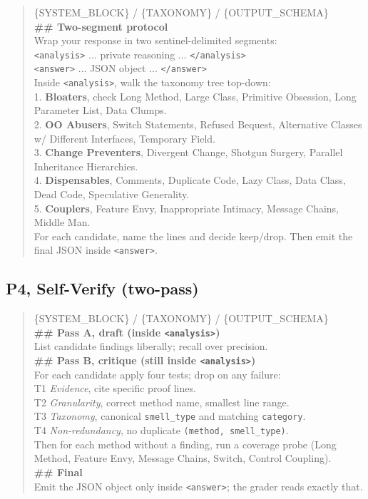 \documentclass[conference]{IEEEtran}
\begin{document}
\begin{quote}\small\ttfamily
\{SYSTEM\_BLOCK\} / \{TAXONOMY\} / \{OUTPUT\_SCHEMA\}\\[0.3em]
\textbf{\#\# Two-segment protocol}\\
Wrap your response in two sentinel-delimited segments:\\
\texttt{<analysis>} ... private reasoning ... \texttt{</analysis>}\\
\texttt{<answer>} ... JSON object ... \texttt{</answer>}\\[0.3em]
Inside \texttt{<analysis>}, walk the taxonomy tree top-down:\\
1. \textbf{Bloaters}, check Long Method, Large Class, Primitive
Obsession, Long Parameter List, Data Clumps.\\
2. \textbf{OO Abusers}, Switch Statements, Refused Bequest, Alternative
Classes w/ Different Interfaces, Temporary Field.\\
3. \textbf{Change Preventers}, Divergent Change, Shotgun Surgery,
Parallel Inheritance Hierarchies.\\
4. \textbf{Dispensables}, Comments, Duplicate Code, Lazy Class, Data
Class, Dead Code, Speculative Generality.\\
5. \textbf{Couplers}, Feature Envy, Inappropriate Intimacy, Message
Chains, Middle Man.\\[0.3em]
For each candidate, name the lines and decide keep/drop. Then emit the
final JSON inside \texttt{<answer>}.
\end{quote}

\subsection{P4, Self-Verify (two-pass)}

\begin{quote}\small\ttfamily
\{SYSTEM\_BLOCK\} / \{TAXONOMY\} / \{OUTPUT\_SCHEMA\}\\[0.3em]
\textbf{\#\# Pass A, draft (inside \texttt{<analysis>})}\\
List candidate findings liberally; recall over precision.\\[0.3em]
\textbf{\#\# Pass B, critique (still inside \texttt{<analysis>})}\\
For each candidate apply four tests; drop on any failure:\\
T1 \textit{Evidence}, cite specific proof lines.\\
T2 \textit{Granularity}, correct method name, smallest line range.\\
T3 \textit{Taxonomy}, canonical \texttt{smell\_type} and matching
\texttt{category}.\\
T4 \textit{Non-redundancy}, no duplicate
\texttt{(method, smell\_type)}.\\
Then for each method without a finding, run a coverage probe (Long Method,
Feature Envy, Message Chains, Switch, Control Coupling).\\[0.3em]
\textbf{\#\# Final}\\
Emit the JSON object only inside \texttt{<answer>}; the grader reads
exactly that.
\end{quote}
\end{document}
